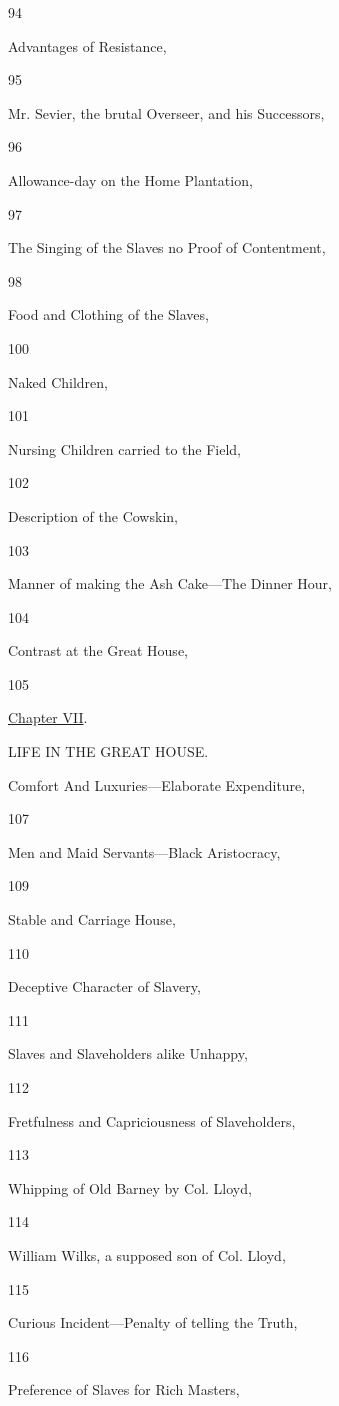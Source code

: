 94

Advantages of Resistance,

95

Mr. Sevier, the brutal Overseer, and his Successors,

96

Allowance-day on the Home Plantation,

97

The Singing of the Slaves no Proof of Contentment,

98

Food and Clothing of the Slaves,

100

Naked Children,

101

Nursing Children carried to the Field,

102

Description of the Cowskin,

103

Manner of making the Ash Cake---The Dinner Hour,

104

Contrast at the Great House,

105

\href{/wiki/My_Bondage_and_My_Freedom_(1855)/Chapter_VII}{Chapter VII}.

LIFE IN THE GREAT HOUSE.

Comfort And Luxuries---Elaborate Expenditure,

107

Men and Maid Servants---Black Aristocracy,

109

Stable and Carriage House,

110

Deceptive Character of Slavery,

111

Slaves and Slaveholders alike Unhappy,

112

Fretfulness and Capriciousness of Slaveholders,

113

Whipping of Old Barney by Col. Lloyd,

114

William Wilks, a supposed son of Col. Lloyd,

115

Curious Incident---Penalty of telling the Truth,

116

Preference of Slaves for Rich Masters,

